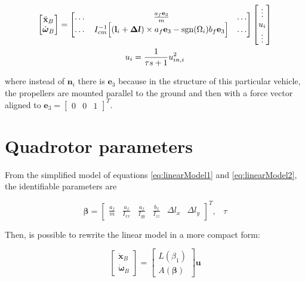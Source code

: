 \begin{gather}
	\begin{bmatrix}
		\ddot{\mathbf{x}}_B \\
		\dot{\boldsymbol{\omega}}_B
	\end{bmatrix}
	=
	\begin{bmatrix}
		\dots & \frac{a_f \mathbf{e}_3}{m} & \dots \\
		\dots & I_{cm}^{-1}\Big[(\mathbf{l}_i+\boldsymbol{\Delta l})\times a_f\mathbf{e}_3-\operatorname*{sgn}(\Omega_i)b_f\mathbf{e}_3\Big] & \dots 
	\end{bmatrix}
	\begin{bmatrix}
		\vdots \\
		u_i \\
		\vdots
	\end{bmatrix} 
	\label{eq:linearModel1}\\
	u_i = \frac{1}{\tau s+1}u_{in,i}^2
	\label{eq:linearModel2}
\end{gather}

\noindent where instead of $\mathbf{n}_i$ there is $\mathbf{e}_3$ because in the structure of this particular vehicle, the propellers are mounted parallel to the ground and then with a force vector aligned to $\mathbf{e}_3=\begin{bmatrix}0 & 0 & 1\end{bmatrix}^T$.


\section{Quadrotor parameters}
\label{quadParameters}

From the simplified model of equations \eqref{eq:linearModel1} and \eqref{eq:linearModel2}, the identifiable parameters are 

\begin{equation}
	\boldsymbol{\beta} =
	\begin{bmatrix}
		\frac{a_f}{m} & \frac{a_f}{I_{xx}} & \frac{a_f}{I_{yy}} & \frac{b_f}{I_{zz}} & \Delta l_x & \Delta l_y 
	\end{bmatrix}^T, \hspace{10pt} \tau
	\label{eq:parameters}
\end{equation}

\noindent Then, is possible to rewrite the linear model in a more compact form:

\begin{equation}
	\begin{bmatrix}
		\ddot{\mathbf{x}}_B \\
		\dot{\boldsymbol{\omega}}_B
	\end{bmatrix}
	=
	\begin{bmatrix}
		L(\beta_1) \\
		A(\boldsymbol{\beta})
	\end{bmatrix}
	\mathbf{u}
	\label{eq:linearCompact}
\end{equation}

